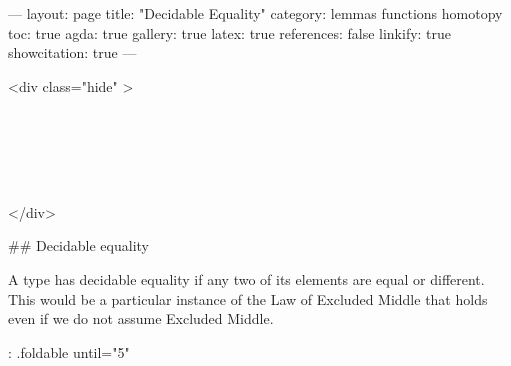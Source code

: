 ---
layout: page
title: "Decidable Equality"
category: lemmas functions homotopy
toc: true
agda: true
gallery: true
latex: true
references: false
linkify: true
showcitation: true
---

<div class="hide" >
\begin{code}%
\>[0]\AgdaSymbol{\{-\#}\AgdaSpace{}%
\AgdaSpace{}%
\AgdaSpace{}%
\AgdaSymbol{\#-\}}\<%
\\
\>[0]\AgdaSpace{}%
\AgdaSpace{}%
\<%
\\
\>[0]\AgdaSpace{}%
\AgdaSpace{}%
\<%
\\
\>[0]\AgdaSpace{}%
\AgdaSpace{}%
\<%
\\
\>[0]\AgdaSpace{}%
\AgdaSpace{}%
\<%
\end{code}
</div>


## Decidable equality

A type has decidable equality if any two of its
elements are equal or different. This would be a particular
instance of the Law of Excluded Middle that holds even if we do not
assume Excluded Middle.

{: .foldable until="5"}
\begin{code}%
\>[0]\AgdaSpace{}%
\AgdaSpace{}%
\AgdaSymbol{\{}\AgdaSymbol{\}}\AgdaSpace{}%
\<%
\\
\>[0]\<%
\end{code}

\begin{code}%
\>[0][@{}l@{\AgdaIndent{1}}]%
\>[2]\<%
\\
\>[2][@{}l@{\AgdaIndent{0}}]%
\>[4]\AgdaSymbol{:}\AgdaSpace{}%
\AgdaSymbol{(}\AgdaSpace{}%
\AgdaSymbol{:}\AgdaSpace{}%
\AgdaSpace{}%
\AgdaSymbol{)}\AgdaSpace{}%
\AgdaSpace{}%
\AgdaSpace{}%
\<%
\\
%
\\[\AgdaEmptyExtraSkip]%
%
\>[2]\AgdaSpace{}%
\AgdaSpace{}%
\AgdaSymbol{=}\AgdaSpace{}%
\AgdaSymbol{(}\AgdaSpace{}%
\AgdaSpace{}%
\AgdaSymbol{:}\AgdaSpace{}%
\AgdaSymbol{)}\AgdaSpace{}%
\AgdaSpace{}%
\AgdaSymbol{(}\AgdaSpace{}%
\AgdaOperator{\AgdaDatatype{==}}\AgdaSpace{}%
\AgdaSymbol{)}\AgdaSpace{}%
\AgdaOperator{\AgdaDatatype{+}}\AgdaSpace{}%
\AgdaSpace{}%
\AgdaSymbol{(}\AgdaSpace{}%
\AgdaOperator{\AgdaDatatype{==}}\AgdaSpace{}%
\AgdaSymbol{)}\<%
\end{code}

